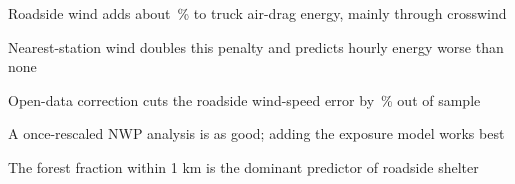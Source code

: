 \item Roadside wind adds about \enAddNo\,\% to truck air-drag energy, mainly through crosswind
\item Nearest-station wind doubles this penalty and predicts hourly energy worse than none
\item Open-data correction cuts the roadside wind-speed error by \noCvRed\,\% out of sample
\item A once-rescaled NWP analysis is as good; adding the exposure model works best
\item The forest fraction within 1 km is the dominant predictor of roadside shelter
